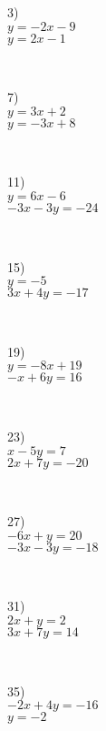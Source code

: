\begin{multicols}{4}
  3)\\ 
  $y = - 2 x - 9$\\
	$y = 2 x - 1$\par
  ~\par
  7)\\ 
  $y = 3 x + 2$\\
	$y = - 3 x + 8$\par
  ~\par
  11)\\ 
  $y = 6 x - 6$\\
	$- 3 x - 3 y = - 24$\par
  ~\par
  15)\\ 
  $y = - 5$\\
	$3 x + 4 y = - 17$\par
  ~\par
  19)\\ 
  $y = - 8 x + 19$\\
	$- x + 6 y = 16$\par
  ~\par
  23)\\ 
  $x - 5 y = 7$\\
	$2 x + 7 y = - 20$\par
  ~\par
  27)\\ 
  $- 6 x + y = 20$\\
  $- 3 x - 3 y = - 18$\par
  ~\par
  31)\\ 
  $2 x + y = 2$\\
  $3 x + 7 y = 14$\par
  ~\par
  35)\\ 
  $- 2 x + 4 y = - 16$\\
  $y = - 2$\par
  ~\par
  

\end{multicols}
